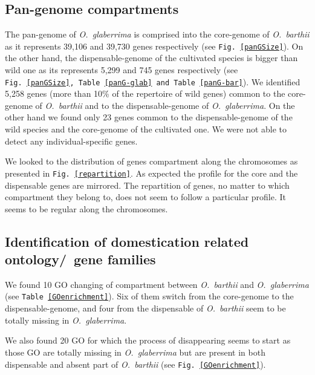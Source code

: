 \documentclass[10pt,letterpaper]{article}
\begin{document}
\subsection{Pan-genome compartments}
The pan-genome of \emph{O.~glaberrima} is comprised into the core-genome of \emph{O.~barthii} as it represents 39,106 and 39,730 genes respectively (see \texttt{Fig.~\ref{panGSize}}). On the other hand, the dispensable-genome of the cultivated species is bigger than wild one as its represents 5,299 and 745 genes respectively (see \texttt{Fig.~\ref{panGSize}, Table \ref{panG-glab} and Table \ref{panG-bar}}).
We identified 5,258 genes (more than 10\% of the repertoire of wild genes) common to the core-genome of \emph{O.~barthii} and to the dispensable-genome of \emph{O.~glaberrima}.  On the other hand we found only 23 genes common to the dispensable-genome of the wild species and the core-genome of the cultivated one. We were not able to detect any individual-specific genes.

We looked to the distribution of genes compartment along the chromosomes as presented in \texttt{Fig.~\ref{repartition}}. As expected the profile for the core and the dispensable genes are mirrored. The repartition of genes, no matter to which compartment they belong to, does not seem to follow a particular profile. It seems to be regular along the chromosomes.

\subsection{Identification of domestication related ontology/~gene families}
We found 10 GO changing of compartment between \emph{O.~barthii} and \emph{O.~glaberrima} (see \texttt{Table~\ref{GOenrichment}}). Six of them switch from the core-genome to the dispensable-genome, and four from the dispensable of \emph{O.~barthii} seem to be totally missing in \emph{O.~glaberrima}.

We also found 20 GO for which the process of disappearing seems to start as those GO are totally missing in \emph{O.~glaberrima} but are present in both dispensable and absent part of \emph{O.~barthii} (see \texttt{Fig.~\ref{GOenrichment}}).
\end{document}
